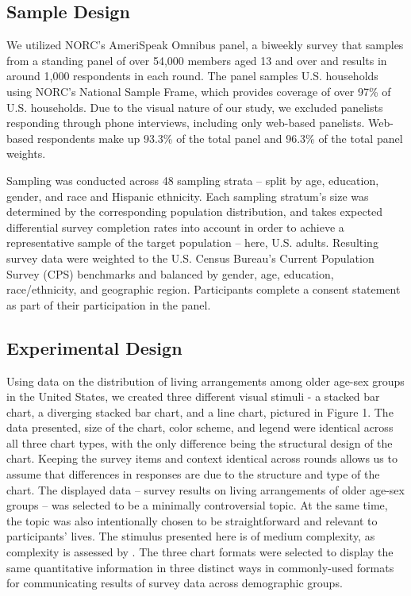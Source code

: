 \documentclass{IEEEcsmag}
\begin{document}
\subsection{Sample Design}\label{sample-design}

We utilized NORC's AmeriSpeak Omnibus panel, a biweekly survey that samples from a standing panel of over 54,000 members aged 13 and over  and results in around 1,000 respondents in each round. The panel samples U.S. households using NORC's National Sample Frame, which provides coverage of over 97\% of U.S. households. Due to the visual nature of our study, we excluded panelists responding through phone interviews, including only web-based panelists. Web-based respondents make up 93.3\% of the total panel and 96.3\% of the total panel weights.

Sampling was conducted across 48 sampling strata -- split by age, education, gender, and race and Hispanic ethnicity. Each sampling stratum's size was determined by the corresponding population distribution, and takes expected differential survey completion rates into account in order to achieve a representative sample of the target population -- here, U.S. adults. Resulting survey data were weighted to the U.S. Census Bureau's Current Population Survey (CPS) benchmarks and balanced by gender, age, education, race/ethnicity, and geographic region. Participants complete a consent statement as part of their participation in the panel.

\subsection{Experimental Design}\label{experimental-design}

Using data on the distribution of living arrangements among older age-sex groups in the United States, we created three different visual stimuli - a stacked bar chart, a diverging stacked bar chart, and a line chart, pictured in Figure 1. The data presented, size of the chart, color scheme, and legend were identical across all three chart types, with the only difference being the structural design of the chart. Keeping the survey items and context identical across rounds allows us to assume that differences in responses are due to the structure and type of the chart. The displayed data -- survey results on living arrangements of older age-sex groups -- was selected to be a minimally controversial topic. At the same time, the topic was also intentionally chosen to be straightforward and relevant to participants' lives. The stimulus presented here is of medium complexity, as complexity is assessed by . The three chart formats were selected to display the same quantitative information in three distinct ways in commonly-used formats for communicating results of survey data across demographic groups.
\end{document}
